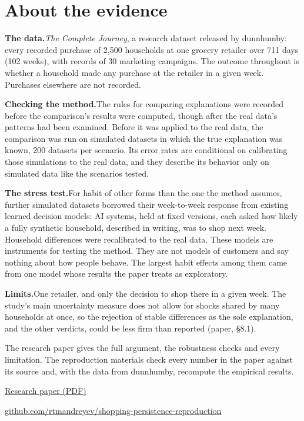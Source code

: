\documentclass[11pt]{article}
\begin{document}
\section{About the evidence}

\textbf{The data.}\enspace \emph{The Complete Journey}, a research dataset released by
dunnhumby: every recorded purchase of 2,500 households at one grocery retailer over 711 days
(102 weeks), with records of 30 marketing campaigns. The outcome throughout is whether a
household made any purchase at the retailer in a given week. Purchases elsewhere are not
recorded.

\textbf{Checking the method.}\enspace The rules for comparing explanations were recorded before
the comparison's results were computed, though after the real data's patterns had been
examined. Before it was applied to the real data, the comparison was run on simulated datasets
in which the true explanation was known, 200 datasets per scenario. Its error rates are
conditional on calibrating those simulations to the real data, and they describe its behavior
only on simulated data like the scenarios tested.

\textbf{The stress test.}\enspace For habit of other forms than the one the method assumes,
further simulated datasets borrowed their week-to-week response from existing learned decision
models: AI systems, held at fixed versions, each asked how likely a fully synthetic household,
described in writing, was to shop next week. Household differences were recalibrated to the
real data. These models are instruments for testing the method. They are not models of
customers and say nothing about how people behave. The largest habit effects among them came
from one model whose results the paper treats as exploratory.

\textbf{Limits.}\enspace One retailer, and only the decision to shop there in a given week. The
study's main uncertainty measure does not allow for shocks shared by many households at once,
so the rejection of stable differences as the sole explanation, and the other verdicts, could
be less firm than reported (paper, §8.1).

The research paper gives the full argument, the robustness
checks and every limitation. The reproduction materials check every number in the paper
against its source and, with the data from dunnhumby, recompute the empirical results.\par
\vspace{5pt}
{\small
\href{https://github.com/rtmandreyev/shopping-persistence-reproduction/blob/main/paper/main.pdf}{Research paper (PDF)}\par
\href{https://github.com/rtmandreyev/shopping-persistence-reproduction}{github.com/rtmandreyev/shopping-persistence-reproduction}\par}
\end{document}
